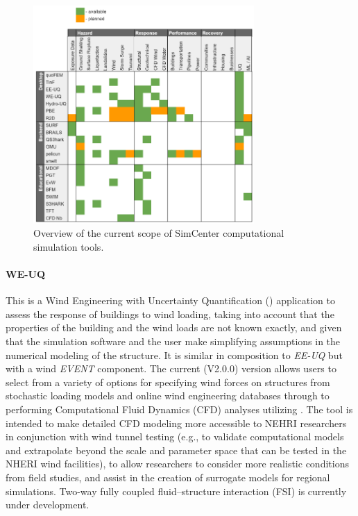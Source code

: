 \begin{figure}[htb]
    \centering
    \includegraphics[width=0.75\textwidth, angle = 0]{Figures/tool_overview.pdf}
    \caption{Overview of the current scope of SimCenter computational simulation tools.}
    \label{fig:intro_tool_overview}
\end{figure}

\paragraph{WE-UQ} This is a Wind Engineering with Uncertainty Quantification () application to assess the response of buildings to wind loading, taking into account that the properties of the building and the wind loads are not known exactly, and given that the simulation software and the user make simplifying assumptions in the numerical modeling of the structure. It is similar in composition to \emph{EE-UQ} but with a wind \emph{EVENT} component.  The current (V2.0.0) version allows users to select from a variety of options for specifying wind forces on structures from stochastic loading models and online wind engineering databases through to performing Computational Fluid Dynamics (CFD) analyses utilizing . The tool is intended to make detailed CFD modeling more accessible to NEHRI researchers in conjunction with wind tunnel testing (e.g., to validate computational models and extrapolate beyond the scale and parameter space that can be tested in the NHERI wind facilities), to allow researchers to consider more realistic conditions from field studies, and assist in the creation of surrogate models for regional simulations. Two-way fully coupled fluid--structure interaction (FSI) is currently under development.

